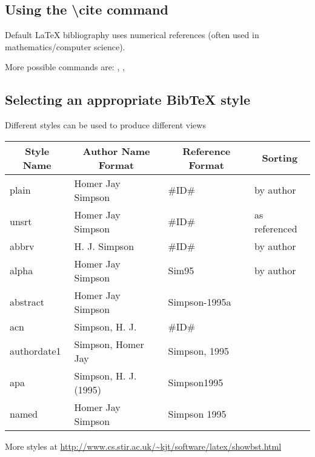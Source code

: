 \subsection{Using the \textbackslash{}cite command}
\begin{frame}
\end{frame}
\begin{frame}
	Default {\LaTeX} bibliography uses numerical references (often used in
	mathematics/computer science).


	More possible commands are: , , 

\end{frame}


\subsection{Selecting an appropriate {Bib\TeX} style}
\begin{frame}
	Different styles can be used to produce different views
	\begin{center}
		\begin{tabular}{l|l|l|l}
		\multicolumn{1}{c|}{Style Name} & \multicolumn{1}{c|}{Author Name Format} & \multicolumn{1}{c|}{Reference Format} & \multicolumn{1}{c}{Sorting} \\ \hline
		plain & Homer Jay Simpson & \#ID\# & by author \\ \hline
		unsrt & Homer Jay Simpson & \#ID\# & as referenced \\ \hline
		abbrv & H. J. Simpson & \#ID\# & by author \\ \hline
		alpha & Homer Jay Simpson & Sim95 & by author \\ \hline
		abstract & Homer Jay Simpson & Simpson-1995a &  \\ \hline
		acn & Simpson, H. J. & \#ID\# &  \\ \hline
		authordate1 & Simpson, Homer Jay & Simpson, 1995 &  \\ \hline
		apa & Simpson, H. J. (1995) & Simpson1995 &  \\ \hline
		named & Homer Jay Simpson & Simpson 1995 &  \\ \hline
		\end{tabular}
	\end{center}

	More styles at
	\url{http://www.cs.stir.ac.uk/~kjt/software/latex/showbst.html}

\end{frame}

